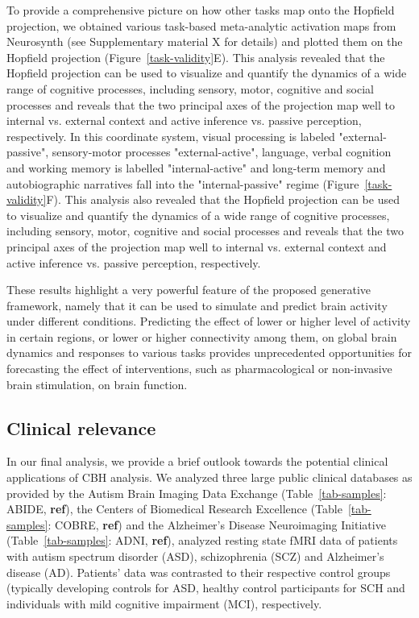 \documentclass{article}
\begin{document}
To provide a comprehensive picture on how other tasks map onto the Hopfield projection, we obtained various task-based meta-analytic activation maps from Neurosynth (see Supplementary material X for details)  and plotted them on the Hopfield projection (Figure~\ref{task-validity}E). This analysis revealed that the Hopfield projection can be used to visualize and quantify the dynamics of a wide range of cognitive processes, including sensory, motor, cognitive and social processes and reveals that the two principal axes of the projection map well to internal vs. external context and active inference vs. passive perception, respectively.
In this coordinate system, visual processing is labeled "external-passive", sensory-motor processes "external-active", language, verbal cognition and working memory is labelled "internal-active" and long-term memory and autobiographic narratives fall into the "internal-passive" regime (Figure~\ref{task-validity}F). This analysis also revealed that the Hopfield projection can be used to visualize and quantify the dynamics of a wide range of cognitive processes, including sensory, motor, cognitive and social processes and reveals that the two principal axes of the projection map well to internal vs. external context and active inference vs. passive perception, respectively.

These results highlight a very powerful feature of the proposed generative framework, namely that it can be used to simulate and predict brain activity under different conditions. Predicting the effect of lower or higher level of activity in certain regions, or lower or higher connectivity among them, on global brain dynamics and responses to various tasks provides unprecedented opportunities for forecasting the effect of interventions, such as pharmacological or non-invasive brain stimulation, on brain function.

\subsection{Clinical relevance}\label{Clinical relevance}

In our final analysis, we provide a brief outlook towards the potential clinical applications of CBH analysis. We analyzed three large public clinical databases as provided by the Autism Brain Imaging Data Exchange (Table~\ref{tab-samples}: ABIDE, \textbf{ref}), the Centers of Biomedical Research Excellence (Table~\ref{tab-samples}: COBRE, \textbf{ref}) and the Alzheimer's Disease Neuroimaging Initiative (Table~\ref{tab-samples}: ADNI, \textbf{ref}), analyzed resting state fMRI data of patients with autism spectrum disorder (ASD), schizophrenia (SCZ) and Alzheimer's disease (AD). Patients' data was contrasted to their respective control groups (typically developing controls for ASD, healthy control participants for SCH and individuals with mild cognitive impairment (MCI), respectively.
\end{document}

